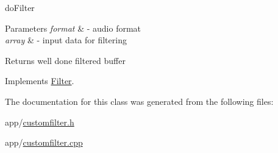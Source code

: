 do\+Filter 


\begin{DoxyParams}{Parameters}
{\em format} & -\/ audio format \\
\hline
{\em array} & -\/ input data for filtering \\
\hline
\end{DoxyParams}
\begin{DoxyReturn}{Returns}
well done filtered buffer 
\end{DoxyReturn}


Implements \hyperlink{class_filter_aa401218a142d916f84aafece09eac301}{Filter}.



The documentation for this class was generated from the following files\+:\begin{DoxyCompactItemize}
\item 
app/\hyperlink{customfilter_8h}{customfilter.\+h}\item 
app/\hyperlink{customfilter_8cpp}{customfilter.\+cpp}\end{DoxyCompactItemize}
